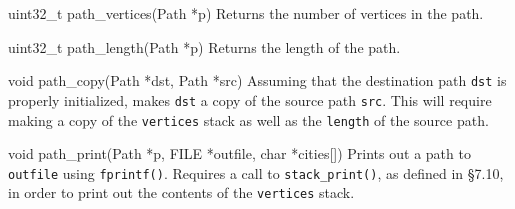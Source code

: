 \begin{funcdoc}{uint32\_t path\_vertices(Path *p)}
  Returns the number of vertices in the path.
\end{funcdoc}

\begin{funcdoc}{uint32\_t path\_length(Path *p)}
  Returns the length of the path.
\end{funcdoc}

\begin{funcdoc}{void path\_copy(Path *dst, Path *src)}
  Assuming that the destination path \texttt{dst} is properly initialized,
  makes \texttt{dst} a copy of the source path \texttt{src}. This will
  require making a copy of the \texttt{vertices} stack as well as the
  \texttt{length} of the source path.
\end{funcdoc}

\begin{funcdoc}{void path\_print(Path *p, FILE *outfile, char
*cities[])}
  Prints out a path to \texttt{outfile} using \texttt{fprintf()}. Requires
  a call to \texttt{stack\_print()}, as defined in \S 7.10, in order to
  print out the contents of the \texttt{vertices} stack.
\end{funcdoc}






